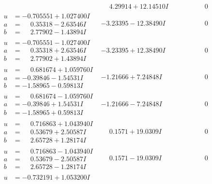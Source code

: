 \documentclass[1p]{elsarticle_modified}
\theoremstyle{definition}
\begin{document}
$$\begin{array}{c|c|c}
 & \phantom{-}4.29914 + 12.14510 I & \phantom{-0.000000 } 0 \\ \hline\begin{aligned}
u &= -0.705551 + 1.027400 I \\
a &= \phantom{-}0.35318 - 2.63546 I \\
b &= \phantom{-}2.77902 - 1.43894 I\end{aligned}
 & -3.23395 - 12.38490 I & \phantom{-0.000000 } 0 \\ \hline\begin{aligned}
u &= -0.705551 - 1.027400 I \\
a &= \phantom{-}0.35318 + 2.63546 I \\
b &= \phantom{-}2.77902 + 1.43894 I\end{aligned}
 & -3.23395 + 12.38490 I & \phantom{-0.000000 } 0 \\ \hline\begin{aligned}
u &= \phantom{-}0.681674 + 1.059760 I \\
a &= -0.39846 - 1.54531 I \\
b &= -1.58965 - 0.59813 I\end{aligned}
 & -1.21666 + 7.24848 I & \phantom{-0.000000 } 0 \\ \hline\begin{aligned}
u &= \phantom{-}0.681674 - 1.059760 I \\
a &= -0.39846 + 1.54531 I \\
b &= -1.58965 + 0.59813 I\end{aligned}
 & -1.21666 - 7.24848 I & \phantom{-0.000000 } 0 \\ \hline\begin{aligned}
u &= \phantom{-}0.716863 + 1.043940 I \\
a &= \phantom{-}0.53679 + 2.50587 I \\
b &= \phantom{-}2.65728 + 1.28174 I\end{aligned}
 & \phantom{-}0.1571 + 19.0309 I & \phantom{-0.000000 } 0 \\ \hline\begin{aligned}
u &= \phantom{-}0.716863 - 1.043940 I \\
a &= \phantom{-}0.53679 - 2.50587 I \\
b &= \phantom{-}2.65728 - 1.28174 I\end{aligned}
 & \phantom{-}0.1571 - 19.0309 I & \phantom{-0.000000 } 0 \\ \hline\begin{aligned}
u &= -0.732191 + 1.053200 I \\

\end{aligned}
\end{array}$$
\end{document}
